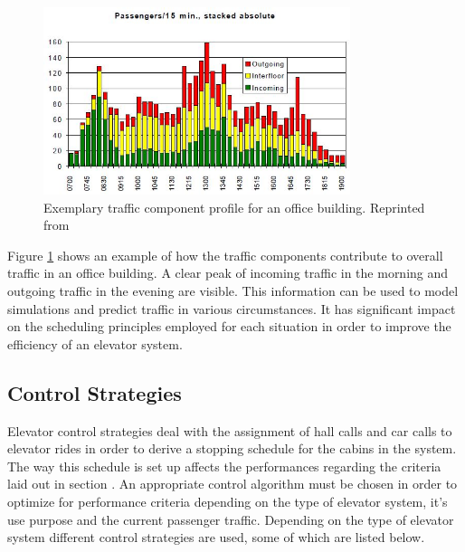 \begin{figure}[hbt]
	\centering
	\includegraphics[width=0.8\textwidth, keepaspectratio]{resources/traffictimes}
	\caption{\label{fig:sota:traffictimes} Exemplary traffic component profile for an office building.
	Reprinted from \textcite[][p.~14]{siikonen1997models}}
\end{figure}

Figure \ref{fig:sota:traffictimes} shows an example of how the traffic components contribute to overall traffic in an office building. A clear peak of incoming traffic in the morning and outgoing traffic in the evening are visible.
This information can be used to model simulations and predict traffic in various circumstances.
It has significant impact on the scheduling principles employed for each situation in order to improve the efficiency of an elevator system.



\subsection{Control Strategies}
\label{sec:sota:strategies}

Elevator control strategies deal with the assignment of hall calls and car calls to elevator rides in order to derive a stopping schedule for the cabins in the system.
The way this schedule is set up affects
the performances regarding the criteria laid out in section \label{sota:sec:perf}.
An appropriate control algorithm must be chosen in order to optimize for performance criteria
depending on the type of elevator system, it's use purpose and the current passenger traffic.
Depending on the type of elevator system different control strategies are used, some of which are listed below.

